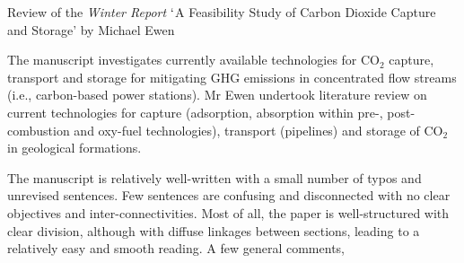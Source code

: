 \documentclass[14pt,twoside]{report}
\begin{document}

\vfill

\clearpage







\bigskip

\begin{center}
  {\Large Review of the {\it Winter Report} $\lq$A Feasibility Study of Carbon Dioxide Capture and Storage' by Michael Ewen}
\end{center}

The manuscript investigates currently available technologies for CO$_{2}$ capture, transport and storage for mitigating GHG emissions in concentrated flow streams (i.e., carbon-based power stations). Mr Ewen undertook  literature review on current technologies for capture (adsorption, absorption within pre-, post-combustion and oxy-fuel technologies), transport (pipelines) and storage of CO$_{2}$ in geological formations.

The manuscript is relatively well-written with a small number of typos and unrevised sentences. Few sentences are confusing and disconnected with no clear objectives and inter-connectivities. Most of all, the paper is well-structured with clear division, although with diffuse linkages between sections, leading to a relatively easy and smooth reading. A few general comments,
\end{document}
